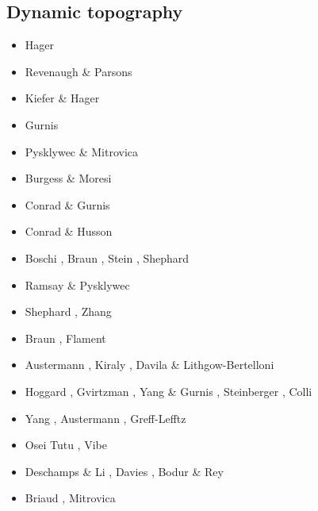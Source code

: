 \subsection{Dynamic topography} 

\begin{scriptsize}
\begin{itemize}
\item[\nineteeneightyfive] Hager \etal \cite{hacr85}
\item[\nineteeneightyseven] Revenaugh \& Parsons \cite{repa87}
\item[\nineteenninetytwo] Kiefer \& Hager \cite{kiha92}
\item[\nineteenninetythree] Gurnis \cite{gurn93,gurn93b}
\item[\nineteenninetyseven] Pysklywec \& Mitrovica \cite{pymi97}
\item[\nineteenninetynine] Burgess \& Moresi \cite{bumo99}
\item[\twothousandthree] Conrad \& Gurnis \cite{cogu03}
\item[\twothousandnine] Conrad \& Husson \cite{cohu09}
\item[\twothousandten] Boschi \etal \cite{bofb10}, Braun \cite{brau10},
                       Stein \etal \cite{stfh10}, Shephard \etal \cite{shml10}
\item[\twothousandeleven] Ramsay \& Pysklywec \cite{rapy11}
\item[\twothousandtwelve] Shephard \etal \cite{shlm12}, Zhang \etal \cite{zhzf12}
\item[\twothousandthirteen] Braun \etal \cite{brrs13}, Flament \etal \cite{flgm13}
\item[\twothousandfifteen] Austermann \etal \cite{aupm15}, Kiraly \etal \cite{kiff15},
                           Davila \& Lithgow-Bertelloni \cite{dali15}
\item[\twothousandsixteen] Hoggard \etal \cite{howa16}, Gvirtzman \etal \cite{gvfb16},
                           Yang \& Gurnis \cite{yagu16}, Steinberger \cite{stei16},
                           Colli \etal \cite{cogb16}
\item[\twothousandseventeen] Yang \etal \cite{yamm17}, Austermann \etal \cite{aumh17},
                             Greff-Lefftz \etal \cite{grrb17}
\item[\twothousandeighteen] Osei Tutu \etal \cite{osss18}, Vibe \etal \cite{vibc18}
\item[\twothousandnineteen] Deschamps \& Li \cite{deli19}, Davies \etal \cite{davk19}, 
                            Bodur \& Rey \cite{bore19}
\item[\twothousandtwenty] Briaud \etal \cite{braf20}, Mitrovica \etal \cite{miac20}
\end{itemize}
\end{scriptsize}


